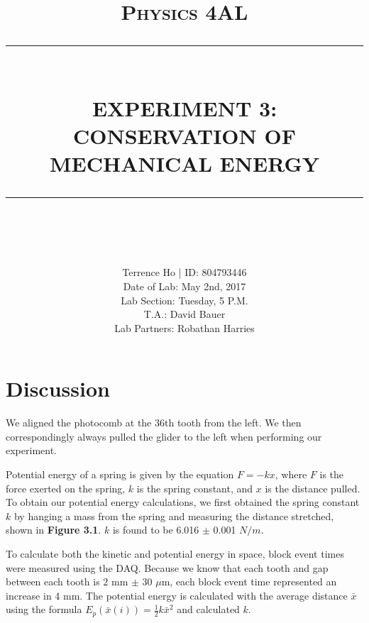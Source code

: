 \documentclass[11pt]{report}
\newcommand{\HRule}[1]{\rule{\linewidth}{#1}}
\begin{document}
\title{ \normalsize \textsc{Physics 4AL}
        \\ [2.0cm]
        \HRule{0.5pt} \\
        \LARGE \textbf{\uppercase{Experiment 3: Conservation of Mechanical Energy}}
        \HRule{2pt} \\ [0.5cm]
        \vspace*{2\baselineskip}}

\date{}

\author{
        Terrence Ho | ID: 804793446 \\ 
        Date of Lab: May 2nd, 2017 \\
        Lab Section: Tuesday, 5 P.M.\\
        T.A.: David Bauer\\
        Lab Partners: Robathan Harries}

\maketitle
\tableofcontents
\newpage

\sectionfont{\scshape}


\section*{Discussion}

We aligned the photocomb at the 36th tooth from the left.  We then
correspondingly always pulled the glider to the left when performing our
experiment.  

Potential energy of a spring is given by the equation \(F = -kx\), where \(F\) is the force
exerted on the spring, \(k\) is the spring constant, and \(x\) is the distance pulled. 
To obtain our potential energy calculations, we first obtained the spring constant 
\(k\) by hanging a mass from the spring and measuring the distance stretched,
shown in \textbf{Figure 3.1}.  \(k\) is found to be 6.016 $\pm$ 0.001 \(N/m\).

To calculate both the kinetic and potential energy in space, block event times
were measured using the DAQ.  Because we know that each tooth and gap between
each tooth is 2 mm $\pm$ 30 $\mu$m, each block event time represented an
increase in 4 mm.  The potential energy is calculated with the average distance
$\bar{x}$ using the formula \(E_p(\bar{x}(i)) = \frac{1}{2}k\bar{x}^2\) and 
calculated \(k\).  
\end{document}

